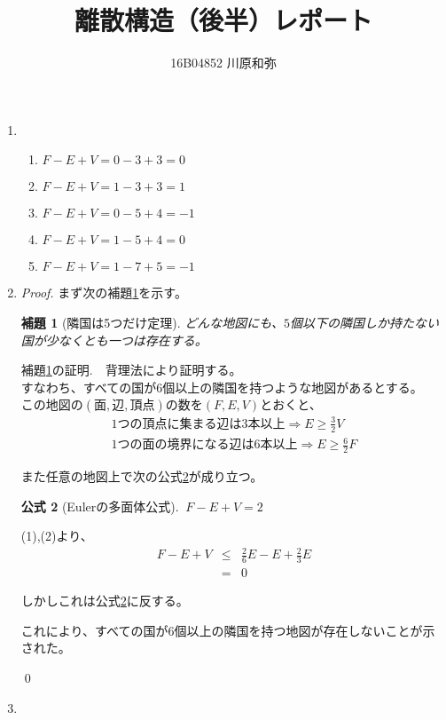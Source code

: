 \documentclass{jsarticle}
\newtheorem{lem}{補題}
\newtheorem{fom}[lem]{公式}
\begin{document}
\title{離散構造（後半）レポート}
\author{16B04852 川原和弥}
\date{}
\maketitle


\begin{enumerate}


\item
\begin{enumerate}
\renewcommand{\labelenumii}{(\arabic{enumii})}
\item $ F - E + V = 0 - 3 + 3  = 0 $
\item $ F - E + V = 1 - 3 + 3  = 1 $
\item $ F - E + V = 0 - 5 + 4  = -1 $
\item $ F - E + V = 1 - 5 + 4  = 0 $
\item $ F - E + V = 1 - 7 + 5  = -1 $
\end{enumerate}


\item
\begin{proof}
まず次の補題\ref{ringoku}を示す。

\begin{lem}[隣国は5つだけ定理]
\label{ringoku}
どんな地図にも、$5$個以下の隣国しか持たない国が少なくとも一つは存在する。
\end{lem}

補題\ref{ringoku}の証明.　背理法により証明する。\\
すなわち、すべての国が6個以上の隣国を持つような地図があるとする。\\
この地図の$(面,辺,頂点)$の数を$(F,E,V)$とおくと、
\begin{eqnarray}
1つの頂点に集まる辺は3本以上 \Rightarrow  E \geq \frac{3}{2} V \\
1つの面の境界になる辺は6本以上 \Rightarrow  E \geq \frac{6}{2} F
\end{eqnarray}

また任意の地図上で次の公式\ref{Euler}が成り立つ。\\
\begin{fom}[Eulerの多面体公式]
\label{Euler}
$\ F - E + V = 2$
\end{fom}

(1),(2)より、
\begin{eqnarray}
F - E + V &\leq& \frac{2}{6} E - E + \frac{2}{3} E \nonumber \\
&=& 0 \nonumber
\end{eqnarray}

しかしこれは公式\ref{Euler}に反する。

これにより、すべての国が6個以上の隣国を持つ地図が存在しないことが示された。

\qed

\end{proof}

\item

\end{enumerate}
\end{document}

